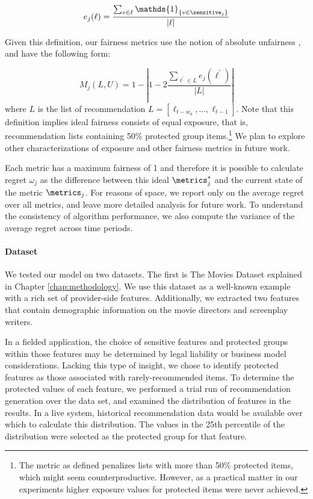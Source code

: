 \begin{equation}
    e_j(\ell) = \frac{\sum_{v \in \ell}{\mathds{1}_{\{v \in \sensitive_j\}}}}{|\ell|}
\end{equation}

Given this definition, our fairness metrics use the notion of absolute unfairness \cite{yao2017beyond}, and have the following form:

\begin{equation}
    M_j(L, U) = 1 - | 1 - 2 \frac{\sum_{\ell^{\prime} \in L}{e_j(\ell^{\prime})}}{|L|} |
\end{equation}
where $L$ is the list of recommendation $L = [\ell_{t-w_b},...,\ell_{t-1}] $. Note that this definition implies ideal fairness consists of equal exposure, that is, recommendation lists containing 50\% protected group items.\footnote{The metric as defined penalizes lists with more than 50\% protected items, which might seem counterproductive. However, as a practical matter in our experiments higher exposure values for protected items were never achieved.} We plan to explore other characterizations of exposure and other fairness metrics in future work. 

Each metric has a maximum fairness of 1 and therefore it is possible to calculate regret $\omega_j$ as the difference between this ideal $\metrics_j^*$ and the current state of the metric $\metrics_j$. For reasons of space, we report only on the average regret over all metrics, and leave more detailed analysis for future work. To understand the consistency of algorithm performance, we also compute the variance of the average regret across time periods.

\noindent \paragraph{Dataset} \newline
\indent We tested our model on two datasets. The first is The Movies Dataset explained in Chapter \ref{chap:methodology}. We use this dataset as a well-known example with a rich set of provider-side features. Additionally, we extracted two features that contain demographic information on the movie directors and screenplay writers.

In a fielded application, the choice of sensitive features and protected groups within those features may be determined by legal liability or business model considerations. Lacking this type of insight, we chose to identify protected features as those associated with rarely-recommended items. To determine the protected values of each feature, we performed a trial run of recommendation generation over the data set, and examined the distribution of features in the results. In a live system, historical recommendation data would be available over which to calculate this distribution. The values in the 25th percentile of the distribution were selected as the protected group for that feature.


